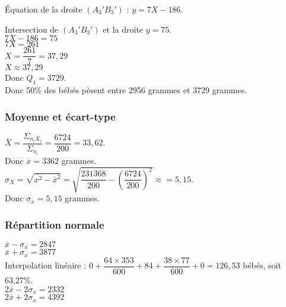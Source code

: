 Équation de la droite $(A_3'B_3')$ : $y= 7X -186 $.

Intersection de $(A_3'B_3')$ et la droite $y=75$. \\

$ 7X - 186 = 75 $ \\

$ 7X = 261 $ \\

$ X = \dfrac{261}{7} = 37,29 $ \\

$ X \approx 37,29 $ \\

Donc $Q_1 = 3729$. \\

Donc 50\% des bébés pèsent entre 2956 grammes et 3729 grammes.

\newpage

\subsubsection{Moyenne et écart-type}

$\overline{X} = \dfrac{\Sigma_{n_iX_i}}{\Sigma_{n_i}} = \dfrac{6724}{200} = 33,62. $ \\

Donc $\overline{x} = 3362$ grammes. \\

$\sigma_X = \sqrt{\overline{x^2} - \overline{x}^2} = \sqrt{\dfrac{231368}{200} - \left(\dfrac{6724}{200}\right)^2} \approx = 5,15$. \\

Donc $ \sigma _x = 5,15$ grammes. \\

\subsubsection{Répartition normale}

$\overline{x} - \sigma_x = 2847$ \\
$\overline{x} + \sigma_x = 3877$ \\

Interpolation linéaire : $ 0 + \dfrac{64 \times 353}{600} + 84 + \dfrac{38 \times 77}{600} + 0 = 126,53$ bébés, soit 63,27\%. \\

$2\overline{x} - 2\sigma_x = 2332$ \\
$2\overline{x} + 2\sigma_x = 4392$ \\

